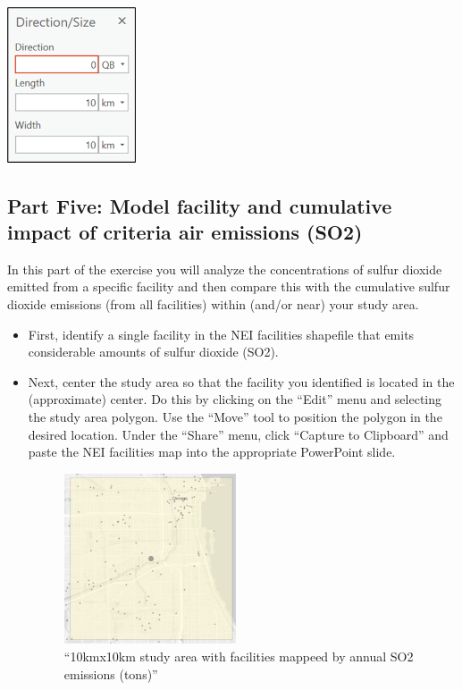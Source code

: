 \documentclass[
  letterpaper,
  DIV=11,
  numbers=noendperiod]{scrartcl}
\begin{document}
\begin{itemize}
  \includegraphics[width=1.5in,height=\textheight]{images/paste-F8F29155.png}
\end{itemize}

\hypertarget{part-five-model-facility-and-cumulative-impact-of-criteria-air-emissions-so2}{%
\subsection{Part Five: Model facility and cumulative impact of criteria
air emissions
(SO2)}\label{part-five-model-facility-and-cumulative-impact-of-criteria-air-emissions-so2}}

In this part of the exercise you will analyze the concentrations of
sulfur dioxide emitted from a specific facility and then compare this
with the cumulative sulfur dioxide emissions (from all facilities)
within (and/or near) your study area.

\begin{itemize}
\item
  First, identify a single facility in the NEI facilities shapefile that
  emits considerable amounts of sulfur dioxide (SO2).
\item
  Next, center the study area so that the facility you identified is
  located in the (approximate) center. Do this by clicking on the
  ``Edit'' menu and selecting the study area polygon. Use the ``Move''
  tool to position the polygon in the desired location. Under the
  ``Share'' menu, click ``Capture to Clipboard'' and paste the NEI
  facilities map into the appropriate PowerPoint slide.

  \begin{figure}

  {\centering \includegraphics[width=2in,height=\textheight]{images/paste-8B95D98A.png}

  }

  \caption{``10kmx10km study area with facilities mappeed by annual SO2
  emissions (tons)''}

  \end{figure}
\end{itemize}
\end{document}
